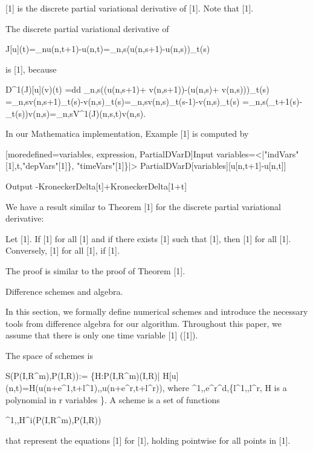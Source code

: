 \documentclass{article}
\begin{document}
{[1] is the {discrete partial variational derivative} of [1].
	Note that [1].


	
	The discrete partial variational derivative of 
	
		{J}[u](t)=_nu(n,t+1)-u(n,t)=_{n,s}(u(n,s+1)-u(n,s))_t(s)
	
	is [1], because
	
	
		D^1({J})[u](v)(t)
		={d}{d} _{n,s}((u(n,s+1)+ v(n,s+1))-(u(n,s)+ v(n,s)))_t(s)
		=_{n,s}v(n,s+1)_t(s)-v(n,s)_t(s)=_{n,s}v(n,s)_t(s-1)-v(n,s)_t(s)
		=_{n,s}(_{t+1}(s)-_t(s))v(n,s)=_{n,s}{V}^1({J})(n,s,t)v(n,s).
	


	In our {Mathematica} implementation, Example [1] is computed by
		
	
		[moredefined={variables, expression, PartialDVarD}]{Input}
  variables=<|"indVars"[1],t,"depVars"[1]\},
  "timeVars"[1]\}|>
  PartialDVarD[variables][u[n,t+1]-u[n,t]]
  

		{Output}
  -KroneckerDelta[t]+KroneckerDelta[1+t]

	

We have a result similar to Theorem [1] for the discrete partial variational derivative:

	Let [1]. If [1] for all [1] and if there exists [1] such that [1], then
	[1]
	for all [1].
	Conversely,
	[1]
	for all [1], if [1].

The proof is similar to the proof of Theorem [1].

Difference schemes and algebra.



In this section, we formally define numerical schemes and introduce the necessary tools from difference algebra for our algorithm.
Throughout this paper, we assume that there is only one time variable [1] ([1]).

	The {space of schemes} is
	
		{S}({P}({I},{R}^m),{P}({I},{R})):=
		\{H:{P}({I},{R}^m)({I},{R})\Bigg|
		H[u](n,t)=H(u(n+{e}^1,t+{l}^1),,u(n+{e}^r,t+{l}^r)),
		{where }
		^1,,{e}^r^d,\{{l}^1,,{l}^r,
		{H is a polynomial in r variables}
		\}.
	A {scheme} is a set of functions
	
		^1,,H^i({P}({I},{R}^m),{P}({I},{R}))
	
	that represent the equations [1] for [1], holding pointwise for all points in [1].

}
\end{document}
